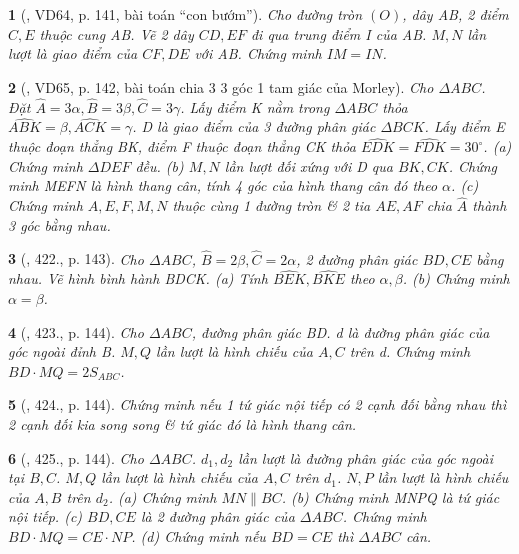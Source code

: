 \documentclass{article}
\newtheorem{baitoan}{}
\begin{document}
\begin{baitoan}[\cite{Binh_Toan_9_tap_2}, VD64, p. 141, bài toán ``con bướm'']
	Cho đường tròn $(O)$, dây AB, 2 điểm $C,E$ thuộc cung AB. Vẽ 2 dây $CD,EF$ đi qua trung điểm I của AB. $M,N$ lần lượt là giao điểm của $CF,DE$ với AB. Chứng minh $IM = IN$.
\end{baitoan}

\begin{baitoan}[\cite{Binh_Toan_9_tap_2}, VD65, p. 142, bài toán chia 3 3 góc 1 tam giác của Morley]
	Cho $\Delta ABC$. Đặt $\widehat{A} = 3\alpha,\widehat{B} = 3\beta,\widehat{C} = 3\gamma$. Lấy điểm K nằm trong $\Delta ABC$ thỏa $\widehat{ABK} = \beta,\widehat{ACK} = \gamma$. D là giao điểm của 3 đường phân giác $\Delta BCK$. Lấy điểm E thuộc đoạn thẳng BK, điểm F thuộc đoạn thẳng CK thỏa $\widehat{EDK} = \widehat{FDK} = 30^\circ$. (a) Chứng minh $\Delta DEF$ đều. (b) $M,N$ lần lượt đối xứng với D qua $BK,CK$. Chứng minh MEFN là hình thang cân, tính 4 góc của hình thang cân đó theo $\alpha$. (c) Chứng minh $A,E,F,M,N$ thuộc cùng 1 đường tròn \& 2 tia $AE,AF$ chia $\widehat{A}$ thành 3 góc bằng nhau.
\end{baitoan}

\begin{baitoan}[\cite{Binh_Toan_9_tap_2}, 422., p. 143]
	Cho $\Delta ABC$, $\widehat{B} = 2\beta,\widehat{C} = 2\alpha$, 2 đường phân giác $BD,CE$ bằng nhau. Vẽ hình bình hành BDCK. (a) Tính $\widehat{BEK},\widehat{BKE}$ theo $\alpha,\beta$. (b) Chứng minh $\alpha = \beta$.
\end{baitoan}

\begin{baitoan}[\cite{Binh_Toan_9_tap_2}, 423., p. 144]
	Cho $\Delta ABC$, đường phân giác BD. d là đường phân giác của góc ngoài đỉnh B. $M,Q$ lần lượt là hình chiếu của $A,C$ trên d. Chứng minh $BD\cdot MQ = 2S_{ABC}$.
\end{baitoan}

\begin{baitoan}[\cite{Binh_Toan_9_tap_2}, 424., p. 144]
	Chứng minh nếu 1 tứ giác nội tiếp có 2 cạnh đối bằng nhau thì 2 cạnh đối kia song song \& tứ giác đó là hình thang cân.
\end{baitoan}

\begin{baitoan}[\cite{Binh_Toan_9_tap_2}, 425., p. 144]
	Cho $\Delta ABC$. $d_1,d_2$ lần lượt là đường phân giác của góc ngoài tại $B,C$. $M,Q$ lần lượt là hình chiếu của $A,C$ trên $d_1$. $N,P$ lần lượt là hình chiếu của $A,B$ trên $d_2$. (a) Chứng minh $MN\parallel BC$. (b) Chứng minh MNPQ là tứ giác nội tiếp. (c) $BD,CE$ là 2 đường phân giác của $\Delta ABC$. Chứng minh $BD\cdot MQ = CE\cdot NP$. (d) Chứng minh nếu $BD = CE$ thì $\Delta ABC$ cân.
\end{baitoan}
\end{document}
